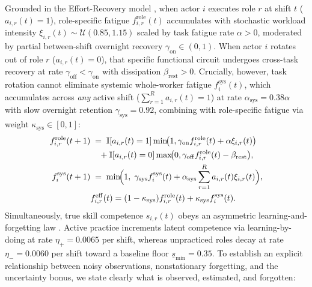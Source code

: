 \documentclass[11pt]{article}
\begin{document}
Grounded in the Effort-Recovery model \citep{meijman1998effort}, when actor $i$ executes role $r$ at shift $t$ ($a_{i,r}(t) = 1$), role-specific fatigue $f_{i,r}^{\mathrm{role}}(t)$ accumulates with stochastic workload intensity $\xi_{i,r}(t) \sim \mathcal{U}(0.85,\allowbreak 1.15)$ scaled by task fatigue rate $\alpha > 0$, moderated by partial between-shift overnight recovery $\gamma_{\mathrm{on}} \allowbreak \in (0,\allowbreak 1)$. When actor $i$ rotates out of role $r$ ($a_{i,r}(t) = 0$), that specific functional circuit undergoes cross-task recovery at rate $\gamma_{\mathrm{off}} < \gamma_{\mathrm{on}}$ with dissipation $\beta_{\mathrm{rest}} > 0$. Crucially, however, task rotation cannot eliminate systemic whole-worker fatigue $f_i^{\mathrm{sys}}(t)$, which accumulates across \emph{any} active shift ($\sum_{r=1}^R a_{i,r}(t) = 1$) at rate $\alpha_{\mathrm{sys}} = 0.38\alpha$ with slow overnight retention $\gamma_{\mathrm{sys}} = 0.92$, combining with role-specific fatigue via weight $\kappa_{\mathrm{sys}} \allowbreak \in [0,\allowbreak 1]$:
\begin{equation}
\begin{aligned}
f_{i,r}^{\mathrm{role}}(t+1) &\;=\; \mathbb{I}[a_{i,r}(t)=1]\min\!\bigl(1, \gamma_{\mathrm{on}} f_{i,r}^{\mathrm{role}}(t) + \alpha \xi_{i,r}(t)\bigr) \\
&\quad + \mathbb{I}[a_{i,r}(t)=0]\max\!\bigl(0, \gamma_{\mathrm{off}} f_{i,r}^{\mathrm{role}}(t) - \beta_{\mathrm{rest}}\bigr), \\
f_i^{\mathrm{sys}}(t+1) &\;=\; \min\!\Bigl(1,\; \gamma_{\mathrm{sys}} f_i^{\mathrm{sys}}(t) + \alpha_{\mathrm{sys}} \sum_{r=1}^R a_{i,r}(t)\xi_{i,r}(t)\Bigr), \\
&f_{i,r}^{\mathrm{eff}}(t) = (1 - \kappa_{\mathrm{sys}})f_{i,r}^{\mathrm{role}}(t) + \kappa_{\mathrm{sys}} f_i^{\mathrm{sys}}(t).
\end{aligned}
\label{eq:fatigue_dyn}
\end{equation}
Simultaneously, true skill competence $s_{i,r}(t)$ obeys an asymmetric learning-and-forgetting law \citep{jaber1996learning, shen2026coding, kosmyna2025brain}. Active practice increments latent competence via learning-by-doing at rate $\eta_+ = 0.0065$ per shift, whereas unpracticed roles decay at rate $\eta_- = 0.0060$ per shift toward a baseline floor $\underline{s}_{\min} = 0.35$. To establish an explicit relationship between noisy observations, nonstationary forgetting, and the uncertainty bonus, we state clearly what is observed, estimated, and forgotten:
\end{document}
